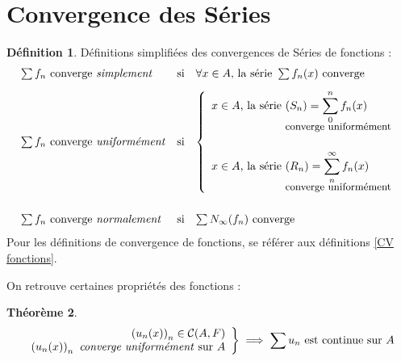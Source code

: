\documentclass[11pt,a4paper]{report}
\newtheorem{theorem}{Théorème}[chapter]
\theoremstyle{definition}
\newtheorem{dfn}[theorem]{Définition}
\begin{document}
\section{Convergence des Séries}
\begin{dfn}
Définitions simplifiées des convergences de Séries de fonctions :\\
\begin{equation}\label{CV Serie}
\begin{array}{l c l}
\sum{f_n}\text{ converge \emph{simplement}}&\text{si}&\forall{}x\in{}A\text{, la série } \sum{f_n(x)} \text{ converge}\\[0.3cm]
\sum{f_n}\text{ converge \emph{uniformément}}&\text{si}&
\left\lbrace 
\begin{array}{l}
\begin{split}
x\in{}A\text{, la série } &(S_n)=\displaystyle\sum_0^n{f_n(x)}\\[-2mm] &\text{{\small  converge uniformément}}\end{split}\\[1cm]  
\begin{split}
x\in{}A\text{, la série } &(R_n)=\displaystyle\sum_n^\infty{f_n(x)}\\[-2mm] &\text{\small converge uniformément}\end{split}\\
\end{array}
\right. \\[2cm]
\sum{f_n}\text{ converge \emph{normalement}}&\text{si}&\sum{N_\infty (f_n)}\text{ converge}
\end{array}
\end{equation}
Pour les définitions de convergence de fonctions, se référer aux définitions \ref{CV fonctions}.
\end{dfn}
On retrouve certaines propriétés des fonctions :
\begin{theorem}

\[
\left.
\begin{array}{r}
\left(u_n(x)\right)_{n}\in\mathcal{C}(A,F)\\
\left(u_n(x)\right)_n \text{ \emph{converge uniformément} sur }A\\
\end{array}\right\rbrace \implies \sum u_n \text{ est continue sur }A\\
\]
\end{theorem}
\end{document}
